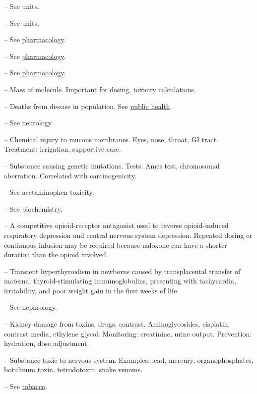 -- See units.

-- See units.

-- See \hyperlink{Pharmacology}{pharmacology}.

-- See \hyperlink{Pharmacology}{pharmacology}.

-- See \hyperlink{Pharmacology}{pharmacology}.

-- Mass of molecule. Important for dosing, toxicity calculations.

-- Deaths from disease in population. See \hyperlink{Public Health}{public health}.


-- See neurology.

-- Chemical injury to mucous membranes. Eyes, nose, throat, GI tract. Treatment: irrigation, supportive care.

-- Substance causing genetic mutations. Tests: Ames test, chromosomal aberration. Correlated with carcinogenicity.

-- See acetaminophen toxicity.

-- See biochemistry.

-- A competitive opioid-receptor antagonist used to reverse opioid-induced respiratory depression and central nervous-system depression. Repeated dosing or continuous infusion may be required because naloxone can have a shorter duration than the opioid involved.

-- Transient hyperthyroidism in newborns caused by transplacental transfer of maternal thyroid-stimulating immunoglobulins, presenting with tachycardia, irritability, and poor weight gain in the first weeks of life.

-- See nephrology.

-- Kidney damage from toxins, drugs, contrast. Aminoglycosides, cisplatin, contrast media, ethylene glycol. Monitoring: creatinine, urine output. Prevention: hydration, dose adjustment.

-- Substance toxic to nervous system. Examples: lead, mercury, organophosphates, botulinum toxin, tetrodotoxin, snake venoms.

-- See \hyperlink{Tobacco}{tobacco}.

